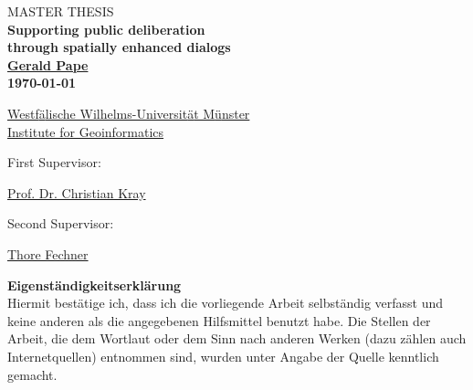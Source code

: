 \onecolumn

\thispagestyle{empty}

\begin{center}
 
\vspace*{5cm}

\textsc{\large MASTER THESIS}\\[1cm]


{ \Huge \textbf{Supporting public deliberation}}\\[0.2cm]
{ \Huge \textbf{through spatially enhanced dialogs}}\\[2.5cm]
 
{\LARGE \textbf{\href{mailto:g.pape@uni-muenster.de}{Gerald Pape}}}\\[1.5cm]
 
{\LARGE \textbf{\today}}\\[5cm]

\end{center}

{\Large
\href{https://www.uni-muenster.de}{Westf{\"a}lische Wilhelms-Universit{\"a}t M{\"u}nster}\\[0.3cm]
\href{http://www.ifgi.de}{Institute for Geoinformatics}\\[0.7cm]

\parbox{4.5cm}{First Supervisor:} \href{mailto:c.kray@uni-muenster.de}{Prof. Dr. Christian Kray}\\[0.3cm]
\parbox{4.5cm}{Second Supervisor:} \href{mailto:t.fechner@uni-muenster.de}{Thore Fechner}
}

\vfill

\newpage

\thispagestyle{empty}

{ \LARGE \textbf{Eigenständigkeitserklärung}}\\[0.2cm]

{  {\large Hiermit bestätige ich, dass ich die vorliegende Arbeit selbständig verfasst und keine anderen als die angegebenen Hilfsmittel benutzt habe. Die Stellen der Arbeit, die dem Wortlaut oder dem Sinn nach anderen Werken (dazu zählen auch Internetquellen) entnommen sind, wurden unter Angabe der Quelle kenntlich gemacht. } }

%

\twocolumn